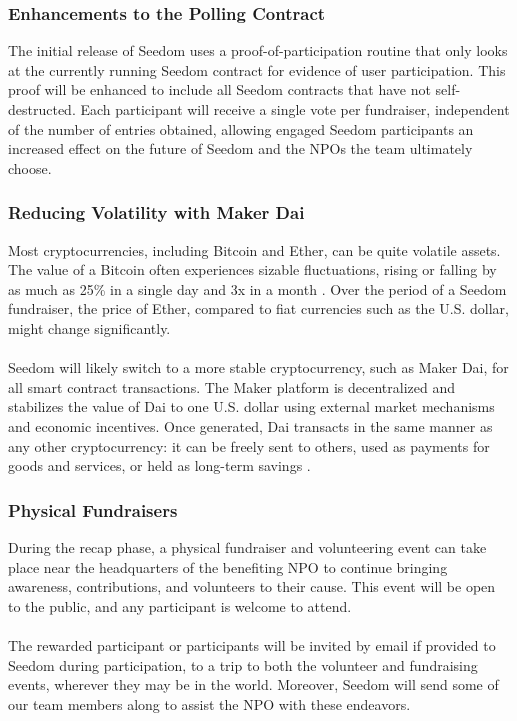 \documentclass[11pt]{article}
\begin{document}
\subsubsection{Enhancements to the Polling Contract}
\label{sec:enhancementsToThePollingContract}

The initial release of Seedom uses a proof-of-participation routine that only looks at the currently running Seedom contract for evidence of user participation. This proof will be enhanced to include all Seedom contracts that have not self-destructed. Each participant will receive a single vote per fundraiser, independent of the number of entries obtained, allowing engaged Seedom participants an increased effect on the future of Seedom and the NPOs the team ultimately choose.

\subsubsection{Reducing Volatility with Maker Dai}

Most cryptocurrencies, including Bitcoin and Ether, can be quite volatile assets. The value of a Bitcoin often experiences sizable fluctuations, rising or falling by as much as 25\% in a single day and 3x in a month \cite{10}. Over the period of a Seedom fundraiser, the price of Ether, compared to fiat currencies such as the U.S. dollar, might change significantly.\\\\
Seedom will likely switch to a more stable cryptocurrency, such as Maker Dai, for all smart contract transactions. The Maker platform is decentralized and stabilizes the value of Dai to one U.S. dollar using external market mechanisms and economic incentives. Once generated, Dai transacts in the same manner as any other cryptocurrency: it can be freely sent to others, used as payments for goods and services, or
held as long-term savings \cite{9}. 

\subsubsection{Physical Fundraisers}

During the recap phase, a physical fundraiser and volunteering event can take place near the headquarters of the benefiting NPO to continue bringing awareness, contributions, and volunteers to their cause. This event will be open to the public, and any participant is welcome to attend.\\\\
The rewarded participant or participants will be invited by email if provided to Seedom during participation, to a trip to both the volunteer and fundraising events, wherever they may be in the world. Moreover, Seedom will send some of our team members along to assist the NPO with these endeavors.
\end{document}
